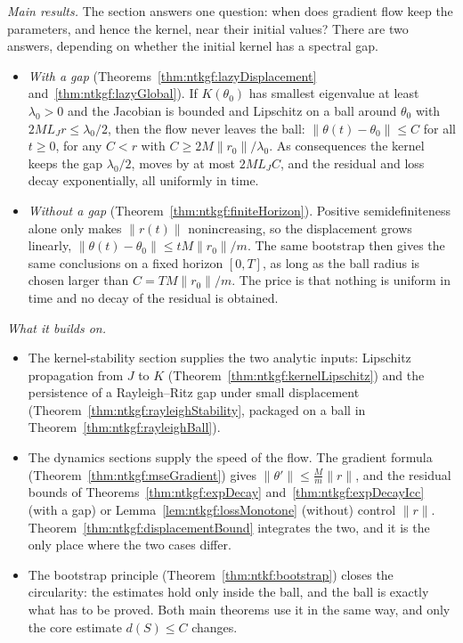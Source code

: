 \begin{remark}\label{rmk:ntkgf:lazyRole}
\emph{Main results.} The section answers one question: when does gradient flow keep the parameters, and hence the kernel, near their initial values? There are two answers, depending on whether the initial kernel has a spectral gap.
\begin{itemize}
  \item \emph{With a gap} (Theorems~\ref{thm:ntkgf:lazyDisplacement} and~\ref{thm:ntkgf:lazyGlobal}). If $K(\theta_0)$ has smallest eigenvalue at least $\lambda_0>0$ and the Jacobian is bounded and Lipschitz on a ball around $\theta_0$ with $2ML_Jr\le\lambda_0/2$, then the flow never leaves the ball: $\|\theta(t)-\theta_0\|\le C$ for all $t\ge0$, for any $C<r$ with $C\ge2M\|r_0\|/\lambda_0$. As consequences the kernel keeps the gap $\lambda_0/2$, moves by at most $2ML_JC$, and the residual and loss decay exponentially, all uniformly in time.
  \item \emph{Without a gap} (Theorem~\ref{thm:ntkgf:finiteHorizon}). Positive semidefiniteness alone only makes $\|r(t)\|$ nonincreasing, so the displacement grows linearly, $\|\theta(t)-\theta_0\|\le tM\|r_0\|/m$. The same bootstrap then gives the same conclusions on a fixed horizon $[0,T]$, as long as the ball radius is chosen larger than $C=TM\|r_0\|/m$. The price is that nothing is uniform in time and no decay of the residual is obtained.
\end{itemize}

\emph{What it builds on.}
\begin{itemize}
  \item The kernel-stability section supplies the two analytic inputs: Lipschitz propagation from $J$ to $K$ (Theorem~\ref{thm:ntkgf:kernelLipschitz}) and the persistence of a Rayleigh--Ritz gap under small displacement (Theorem~\ref{thm:ntkgf:rayleighStability}, packaged on a ball in Theorem~\ref{thm:ntkgf:rayleighBall}).
  \item The dynamics sections supply the speed of the flow. The gradient formula (Theorem~\ref{thm:ntkgf:mseGradient}) gives $\|\theta'\|\le\frac Mm\|r\|$, and the residual bounds of Theorems~\ref{thm:ntkgf:expDecay} and~\ref{thm:ntkgf:expDecayIcc} (with a gap) or Lemma~\ref{lem:ntkgf:lossMonotone} (without) control $\|r\|$. Theorem~\ref{thm:ntkgf:displacementBound} integrates the two, and it is the only place where the two cases differ.
  \item The bootstrap principle (Theorem~\ref{thm:ntkf:bootstrap}) closes the circularity: the estimates hold only inside the ball, and the ball is exactly what has to be proved. Both main theorems use it in the same way, and only the core estimate $d(S)\le C$ changes.
\end{itemize}


\end{remark}
